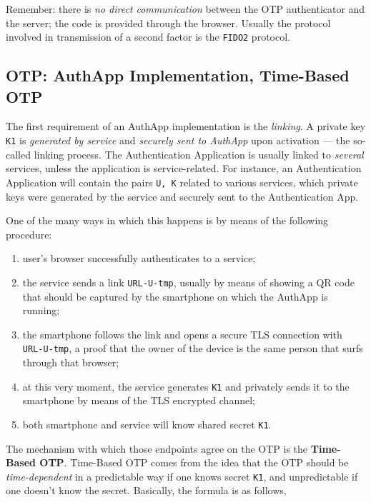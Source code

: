 \documentclass[10pt]{extreport}
\begin{document}
Remember: there is \emph{no direct communication} between the OTP authenticator
and the server; the code is provided through the browser. Usually the protocol
involved in transmission of a second factor is the \texttt{FIDO2} protocol.

\subsection{OTP: AuthApp Implementation, Time\--Based OTP}

The first requirement of an AuthApp implementation is the \emph{linking}. A
private key \texttt{K1} is \emph{generated by service} and \emph{securely sent
to AuthApp} upon activation --- the so\--called linking process. The
Authentication Application is usually linked to \emph{several} services, unless
the application is service\--related. For instance, an Authentication
Application will contain the pairs \texttt{U, K} related to various services,
which private keys were generated by the service and securely sent to the
Authentication App.

One of the many ways in which this happens is by means of the following
procedure:
\begin{enumerate}
    \item user's browser successfully authenticates to a service;
    \item the service sends a link \texttt{URL-U-tmp}, usually by means of
        showing a QR code that should be captured by the smartphone on which
        the AuthApp is running;
    \item the smartphone follows the link and opens a secure TLS connection
        with \texttt{URL-U-tmp},  a proof that the owner of the device is the
        same person that surfs through that browser;
    \item at this very moment, the service generates \texttt{K1} and privately
        sends it to the smartphone by means of the TLS encrypted channel;
    \item both smartphone and service will know shared secret \texttt{K1}.
\end{enumerate}

The mechanism with which those endpoints agree on the OTP is the
\textbf{Time\--Based OTP}. Time\--Based OTP comes from the idea that the OTP
should be \emph{time\--dependent} in a predictable way if one knows secret
\texttt{K1}, and unpredictable if one doesn't know the secret. Basically, the
formula is as follows,
\end{document}
